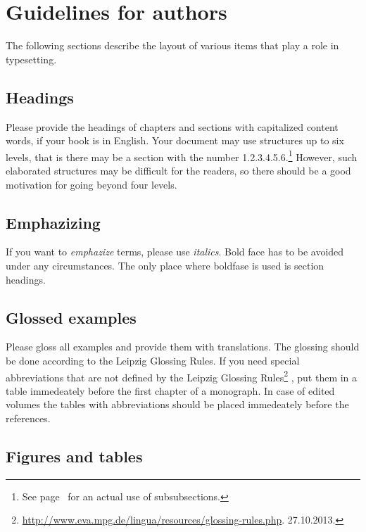 \chapter{Guidelines for authors}

The following sections describe the layout of various items that play a role in typesetting. 

\section{Headings}

Please provide the headings of chapters and sections with capitalized content words, if your book is
in English. Your document may use structures up to six levels, that is there may be a section with
the number 1.2.3.4.5.6.\footnote{
  See page~\pageref{sec-Chinese} for an actual use of subsubsections.%
} However, such elaborated structures may be difficult for the readers, so
there should be a good motivation for going beyond four levels.


\section{Emphazizing}

If you want to \emph{emphazize} terms, please use \emph{italics}. Bold face has to be avoided under
any circumstances. The only place where boldfase is used is section headings.

\section{Glossed examples}

Please gloss all examples and provide them with translations. The glossing should be done according
to the Leipzig Glossing Rules. If you need special abbreviations that are not defined by the Leipzig
Glossing Rules\footnote{
\url{http://www.eva.mpg.de/lingua/resources/glossing-rules.php}. 27.10.2013.
}
, put them in a table immedeately before the first chapter of a
monograph. In case of edited volumes the tables with abbreviations should be placed immedeately
before the references.

\section{Figures and tables}

